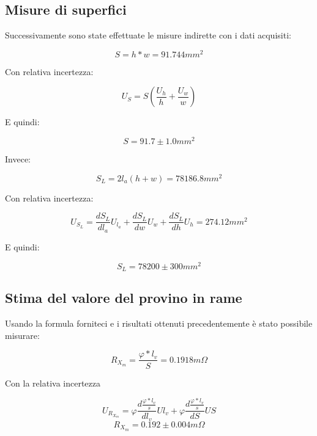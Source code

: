\documentclass[a4paper]{article}
\begin{document}
\subsection{Misure di superfici}
Successivamente sono state effettuate le misure indirette con i dati acquisiti:
\begin{Large} 
	\begin{equation}
		S = h*w = 91.744 mm^2
	 \end{equation}
\end{Large}
Con relativa incertezza:
\begin{Large} 
	\begin{equation}
		U_{S} =S(\frac{U_h}{h}+\frac{U_w}{w})
	 \end{equation}
\end{Large}
E quindi: 
\begin{Large} 
	\begin{equation}
		S =91.7\pm 1.0mm^2
	 \end{equation}
\end{Large}
Invece:
\begin{Large} 
	\begin{equation}
		S_L= 2l_a(h+w) = 78186.8 mm^2
	 \end{equation}
\end{Large}
Con relativa incertezza:
\begin{Large} 
	\begin{equation}
		U_{S_L} =\frac{dS_L}{dl_a}U_{l_a}+\frac{dS_L}{dw}U_w+\frac{dS_L}{dh}U_h=274.12 mm^2
	 \end{equation}
\end{Large}
E quindi: 
\begin{Large} 
	\begin{equation}
		S_L =78200\pm 300mm^2
	 \end{equation}
\end{Large}
\subsection{Stima del valore del provino in rame}
Usando la formula forniteci e i risultati ottenuti precedentemente è stato possibile misurare:
\begin{Large}
	\begin{equation}
		R_{X_{m}} =\frac{\varphi*l_v}{S}= 0.1918 m\Omega
	 \end{equation}
\end{Large}
Con la relativa incertezza
\begin{Large}
	\begin{equation}
		U_{R_{X_{m}}} = \varphi\frac{d\frac{\varphi*l_v}{s}}{dl_v}U{l_v}+\varphi\frac{d\frac{\varphi*l_v}{s}}{dS}U{S}
	 \end{equation}
	 \begin{equation}
		R_{X_{m}} =0.192\pm 0.004 m \Omega
	 \end{equation}
\end{Large}
\end{document}
